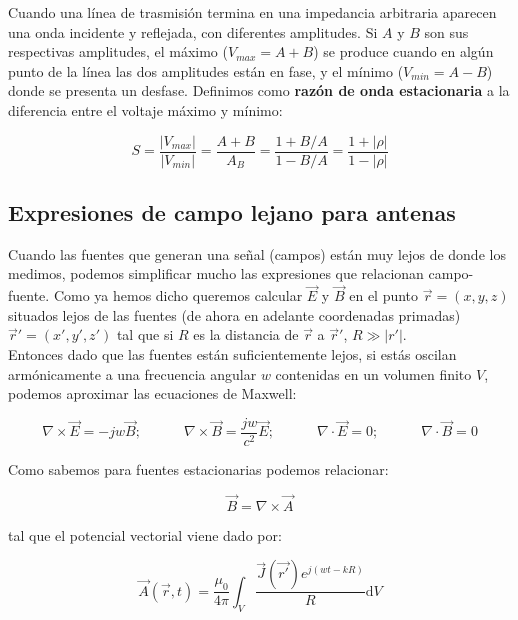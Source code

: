 \documentclass[12pt,a4paper]{article}
\newcommand{\D}{\mathrm{d}}
\newcommand{\tquad}{\quad \quad \quad}
\newcommand{\rota}{\nabla \times}
\newcommand{\dive}{\nabla \cdot}
\begin{document}
Cuando una línea de trasmisión termina en una impedancia arbitraria aparecen una onda incidente y reflejada, con diferentes amplitudes. Si $A$ y $B$ son sus respectivas amplitudes, el máximo ($V_{max} = A+B$) se produce cuando en algún punto de la línea las dos amplitudes están en fase, y el mínimo ($V_{min} = A-B$) donde se presenta un desfase. Definimos como \textbf{razón de onda estacionaria} a la diferencia entre el voltaje máximo y mínimo:

\begin{equation}
S = \dfrac{|V_{max}|}{|V_{min}|} = \dfrac{A+B}{A_B} = \dfrac{1+B/A}{1-B/A} = \dfrac{1+|\rho |}{1-|\rho|}
\end{equation}

\subsection{Expresiones de campo lejano para antenas}

Cuando las fuentes que generan una señal (campos) están muy lejos de donde los medimos, podemos simplificar mucho las expresiones que relacionan campo-fuente. Como ya hemos dicho queremos calcular $\vec{E}$ y $\vec{B}$ en el punto $\vec{r} = (x,y,z)$ situados lejos de las fuentes (de ahora en adelante coordenadas primadas) $\vec{r}'=(x',y',z')$ tal que si $R$ es la distancia de $\vec{r}$ a $\vec{r}'$, $R \gg |r'|$.\\


Entonces dado que las fuentes están suficientemente lejos,  si estás oscilan armónicamente a una frecuencia angular $w$ contenidas en un volumen finito $V$, podemos aproximar las ecuaciones de Maxwell:

\begin{equation}
\rota \vec{E} = -  j w \vec{B}; \tquad \rota \vec{B}  = \dfrac{j w}{c^2} \vec{E}; \tquad \dive \vec{E} = 0; \tquad \dive \vec{B} = 0
\end{equation}

Como sabemos para fuentes estacionarias podemos relacionar:

\begin{equation}
\vec{B} = \rota \vec{A}
\end{equation}

tal que el potencial vectorial viene dado por:

\begin{equation}
\vec{A}(\vec{r},t) = \dfrac{\mu_0}{4 \pi} \int_V \dfrac{\vec{J} (\vec{r'}) e^{j(wt-kR)}}{R} \D V
\end{equation}
\end{document}

